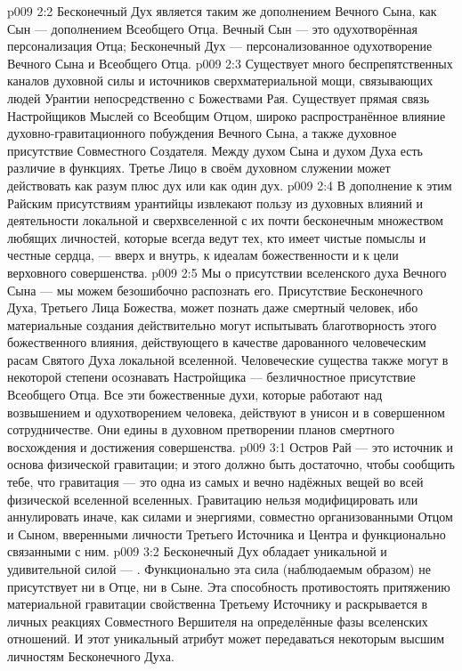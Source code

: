\vs p009 2:2 Бесконечный Дух является таким же дополнением Вечного Сына, как Сын --- дополнением Всеобщего Отца. Вечный Сын --- это одухотворённая персонализация Отца; Бесконечный Дух --- персонализованное одухотворение Вечного Сына и Всеобщего Отца.
\vs p009 2:3 Существует много беспрепятственных каналов духовной силы и источников сверхматериальной мощи, связывающих людей Урантии непосредственно с Божествами Рая. Существует прямая связь Настройщиков Мыслей со Всеобщим Отцом, широко распространённое влияние духовно\hyp{}гравитационного побуждения Вечного Сына, а также духовное присутствие Совместного Создателя. Между духом Сына и духом Духа есть различие в функциях. Третье Лицо в своём духовном служении может действовать как разум плюс дух или как один дух.
\vs p009 2:4 В дополнение к этим Райским присутствиям урантийцы извлекают пользу из духовных влияний и деятельности локальной и сверхвселенной с их почти бесконечным множеством любящих личностей, которые всегда ведут тех, кто имеет чистые помыслы и честные сердца, --- вверх и внутрь, к идеалам божественности и к цели верховного совершенства.
\vs p009 2:5 Мы  о присутствии вселенского духа Вечного Сына --- мы можем безошибочно распознать его. Присутствие Бесконечного Духа, Третьего Лица Божества, может познать даже смертный человек, ибо материальные создания действительно могут испытывать благотворность этого божественного влияния, действующего в качестве дарованного человеческим расам Святого Духа локальной вселенной. Человеческие существа также могут в некоторой степени осознавать Настройщика --- безличностное присутствие Всеобщего Отца. Все эти божественные духи, которые работают над возвышением и одухотворением человека, действуют в унисон и в совершенном сотрудничестве. Они едины в духовном претворении планов смертного восхождения и достижения совершенства.
\vs p009 3:1 Остров Рай --- это источник и основа физической гравитации; и этого должно быть достаточно, чтобы сообщить тебе, что гравитация --- это одна из самых  и вечно надёжных вещей во всей физической вселенной вселенных. Гравитацию нельзя модифицировать или аннулировать иначе, как силами и энергиями, совместно организованными Отцом и Сыном, вверенными личности Третьего Источника и Центра и функционально связанными с ним.
\vs p009 3:2 \pc Бесконечный Дух обладает уникальной и удивительной силой --- . Функционально эта сила (наблюдаемым образом) не присутствует ни в Отце, ни в Сыне. Эта способность противостоять притяжению материальной гравитации свойственна Третьему Источнику и раскрывается в личных реакциях Совместного Вершителя на определённые фазы вселенских отношений. И этот уникальный атрибут может передаваться некоторым высшим личностям Бесконечного Духа.
